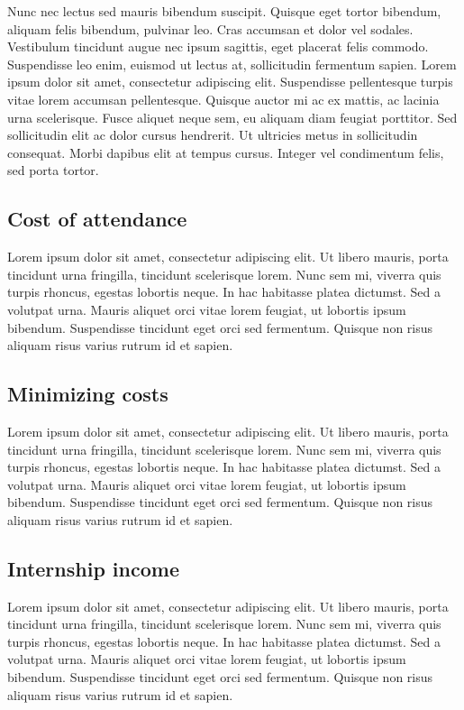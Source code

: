 \documentclass[journal]{IEEEtran}
\begin{document}
Nunc nec lectus sed mauris bibendum suscipit. Quisque eget tortor bibendum, aliquam felis bibendum, pulvinar leo. Cras accumsan et dolor vel sodales. Vestibulum tincidunt augue nec ipsum sagittis, eget placerat felis commodo. Suspendisse leo enim, euismod ut lectus at, sollicitudin fermentum sapien. Lorem ipsum dolor sit amet, consectetur adipiscing elit. Suspendisse pellentesque turpis vitae lorem accumsan pellentesque. Quisque auctor mi ac ex mattis, ac lacinia urna scelerisque. Fusce aliquet neque sem, eu aliquam diam feugiat porttitor. Sed sollicitudin elit ac dolor cursus hendrerit. Ut ultricies metus in sollicitudin consequat. Morbi dapibus elit at tempus cursus. Integer vel condimentum felis, sed porta tortor.
\subsection{Cost of attendance}
Lorem ipsum dolor sit amet, consectetur adipiscing elit. Ut libero mauris, porta tincidunt urna fringilla, tincidunt scelerisque lorem. Nunc sem mi, viverra quis turpis rhoncus, egestas lobortis neque. In hac habitasse platea dictumst. Sed a volutpat urna. Mauris aliquet orci vitae lorem feugiat, ut lobortis ipsum bibendum. Suspendisse tincidunt eget orci sed fermentum. Quisque non risus aliquam risus varius rutrum id et sapien.

\subsection{Minimizing costs}
Lorem ipsum dolor sit amet, consectetur adipiscing elit. Ut libero mauris, porta tincidunt urna fringilla, tincidunt scelerisque lorem. Nunc sem mi, viverra quis turpis rhoncus, egestas lobortis neque. In hac habitasse platea dictumst. Sed a volutpat urna. Mauris aliquet orci vitae lorem feugiat, ut lobortis ipsum bibendum. Suspendisse tincidunt eget orci sed fermentum. Quisque non risus aliquam risus varius rutrum id et sapien.

\subsection{Internship income}
Lorem ipsum dolor sit amet, consectetur adipiscing elit. Ut libero mauris, porta tincidunt urna fringilla, tincidunt scelerisque lorem. Nunc sem mi, viverra quis turpis rhoncus, egestas lobortis neque. In hac habitasse platea dictumst. Sed a volutpat urna. Mauris aliquet orci vitae lorem feugiat, ut lobortis ipsum bibendum. Suspendisse tincidunt eget orci sed fermentum. Quisque non risus aliquam risus varius rutrum id et sapien.
\end{document}
